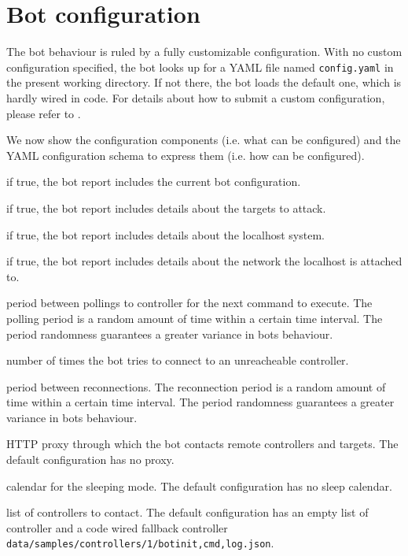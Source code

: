 \section{Bot configuration}
\label{sec:bot-configuration}

The bot behaviour is ruled by a fully customizable configuration. With no custom configuration specified, the bot looks up for a YAML file named \texttt{config.yaml} in the present working directory. If not there, the bot loads the default one, which is hardly wired in code. For details about how to submit a custom configuration, please refer to .

We now show the configuration components (i.e. what can be configured) and the YAML configuration schema to express them (i.e. how can be configured).

\begin{description}
  \setlength\itemsep{1em}

  \item[cnfInfo] if true, the bot report includes the current bot configuration.

  \item[tgtInfo] if true, the bot report includes details about the targets to attack.

  \item[sysInfo] if true, the bot report includes details about the localhost system.

  \item[netInfo] if true, the bot report includes details about the network the localhost is attached to.

  \item[polling] period between pollings to controller for the next command to execute. The polling period is a random amount of time within a certain time interval. The period randomness guarantees a greater variance in bots behaviour.

  \item[reconnections] number of times the bot tries to connect to an unreacheable controller.

  \item[reconnectionWait] period between reconnections. The reconnection period is a random amount of time within a certain time interval. The period randomness guarantees a greater variance in bots behaviour.

  \item[proxy] HTTP proxy through which the bot contacts remote controllers and targets. The default configuration has no proxy.

  \item[sleep] calendar for the sleeping mode. The default configuration has no sleep calendar.

  \item[controllers] list of controllers to contact. The default configuration has an empty list of controller and a code wired fallback controller \texttt{data/samples/controllers/1/bot{init,cmd,log}.json}.
\end{description}

